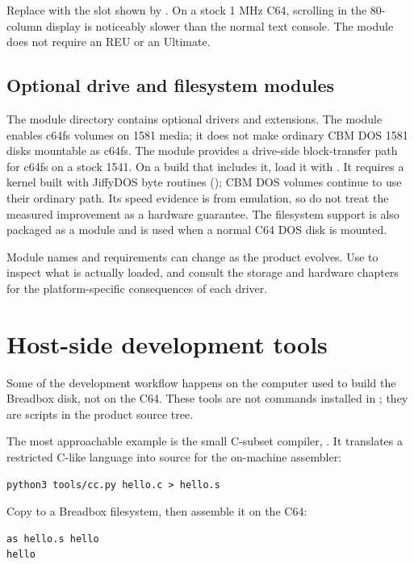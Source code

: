 Replace  with the slot shown by . On a stock 1 MHz C64, scrolling in the 80-column display is noticeably slower than the normal text console. The module does not require an REU or an Ultimate.

\subsection{Optional drive and filesystem modules}

The module directory  contains optional drivers and extensions. The  module enables c64fs volumes on 1581 media; it does not make ordinary CBM DOS 1581 disks mountable as c64fs. The  module provides a drive-side block-transfer path for c64fs on a stock 1541. On a build that includes it, load it with . It requires a kernel built with JiffyDOS byte routines (); CBM DOS volumes continue to use their ordinary path. Its speed evidence is from emulation, so do not treat the measured improvement as a hardware guarantee. The  filesystem support is also packaged as a module and is used when a normal C64 DOS disk is mounted.

Module names and requirements can change as the product evolves. Use  to inspect what is actually loaded, and consult the storage and hardware chapters for the platform-specific consequences of each driver.

\section{Host-side development tools}

Some of the development workflow happens on the computer used to build the Breadbox disk, not on the C64. These tools are not commands installed in ; they are scripts in the product source tree.

The most approachable example is the small C-subset compiler, . It translates a restricted C-like language into source for the on-machine assembler:

\begin{lstlisting}
python3 tools/cc.py hello.c > hello.s
\end{lstlisting}

Copy  to a Breadbox filesystem, then assemble it on the C64:

\begin{lstlisting}
as hello.s hello
hello
\end{lstlisting}

